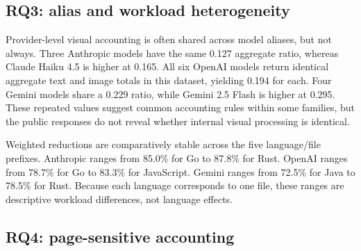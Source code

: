 \documentclass[sigconf,nonacm]{acmart}
\begin{document}
\begin{table}[t]
  \centering
  \caption{Weighted input-token reduction by source length. Negative values
  mean that compact images receive more reported tokens than raw text.}
  \label{tab:size}
  \resizebox{\textwidth}{!}{}
\end{table}

\subsection{RQ3: alias and workload heterogeneity}

Provider-level visual accounting is often shared across model aliases, but not
always. Three Anthropic models have the same 0.127 aggregate ratio, whereas
Claude Haiku 4.5 is higher at 0.165. All six OpenAI models return identical
aggregate text and image totals in this dataset, yielding 0.194 for each. Four
Gemini models share a 0.229 ratio, while Gemini 2.5 Flash is higher at 0.295.
These repeated values suggest common accounting rules within some families, but
the public responses do not reveal whether internal visual processing is
identical.

Weighted reductions are comparatively stable across the five language/file
prefixes. Anthropic ranges from 85.0\% for Go to 87.8\% for Rust. OpenAI ranges
from 78.7\% for Go to 83.3\% for JavaScript. Gemini ranges from 72.5\% for Java
to 78.5\% for Rust. Because each language corresponds to one file, these ranges
are descriptive workload differences, not language effects.

\begin{table}[t]
  \centering
  \caption{Weighted accounting by model. Repeated values identify shared
  \emph{reported} accounting in this dataset, not necessarily shared internal
  computation.}
  \label{tab:models}
  \scriptsize
  \resizebox{\columnwidth}{!}{}
\end{table}

\begin{table}[t]
  \centering
  \caption{Weighted input-token reduction by language/file. Each row is one
  project file, so differences cannot be attributed to language alone.}
  \label{tab:languages}
  
\end{table}

\subsection{RQ4: page-sensitive accounting}
\end{document}
